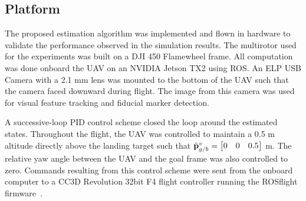 
\subsection{Platform}
The proposed estimation algorithm was implemented and flown in
hardware to validate the performance observed in the simulation
results. The multirotor used for the experiments was built on a DJI 450 Flamewheel
frame. All computation was done onboard the UAV on an NVIDIA Jetson TX2 using
ROS. An ELP
USB Camera with a 2.1 mm lens was mounted to the bottom of the UAV such that the
camera faced downward during flight. The image from this camera was used for visual
feature tracking and fiducial marker detection.

A successive-loop PID control scheme closed the loop around the
estimated states. Throughout the flight, the UAV was controlled to maintain a
0.5 m altitude directly above the landing target such that $\hat{\boldsymbol{\mathrm{p}}}_{g/b}^v =
\begin{bmatrix} 0 & 0 & 0.5 \end{bmatrix}$ m.
The relative yaw
angle between the UAV and the goal frame was also controlled to zero.
Commands resulting from this control scheme were sent from
the onboard computer to a CC3D Revolution 32bit F4 flight controller running
the ROSflight firmware~\cite{jackson2016rosflight}.

